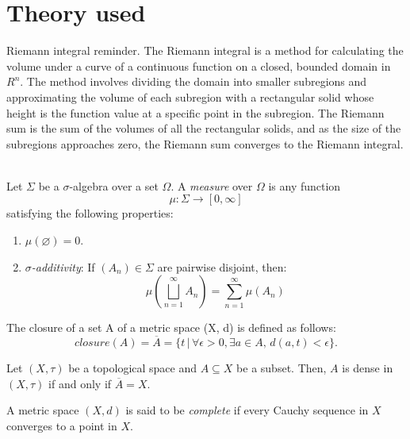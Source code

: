 \documentclass[../main.tex]{subfiles}
\begin{document}
\appendix

\chapter{ Theory used} \label{apx:purification_with_noise}

\begin{definition} Riemann integral reminder. 
The Riemann integral is a method for calculating the volume under a curve of a continuous function on a closed, bounded domain in $R^n$. The method involves dividing the domain into smaller subregions and approximating the volume of each subregion with a rectangular solid whose height is the function value at a specific point in the subregion. The Riemann sum is the sum of the volumes of all the rectangular solids, and as the size of the subregions approaches zero, the Riemann sum converges to the Riemann integral. \\ \\
\end{definition}

\begin{definition}
	Let $\Sigma$ be a $\sigma$-algebra over a set $\Omega$. A \emph{measure} over $\Omega$ is any function $$\mu:\Sigma\longrightarrow[0,\infty]$$ satisfying the following properties:
	\begin{enumerate}
		\item $\mu(\varnothing)=0$.
		\item\label{RFA:sigmaadditivity} \emph{$\sigma$-additivity}: If $(A_n)\in\Sigma$ are pairwise disjoint, then: $$\mu\left(\bigsqcup_{n=1}^\infty A_n\right)=\sum_{n=1}^\infty \mu(A_n)$$
	\end{enumerate}
\end{definition}

\begin{definition}The closure of a set A of a metric space (X, d) is defined as follows:
	$$closure(A) = \overline{A}=\{t \, |  \, \forall \epsilon> 0, \exists a \in A, \, d(a, t) < \epsilon\}.$$
\end{definition}

\begin{propo}
 Let $(X,\tau)$ be a topological space and $A\subseteq X$ be a subset. Then, $A$ is dense in $(X,\tau)$ if and only if $\overline{A}=X$.
\end{propo}

\begin{definition} A metric space $(X,d)$ is said to be \emph{complete} if every Cauchy sequence in $X$ converges to a point in $X$. 
\end{definition}
\end{document}
